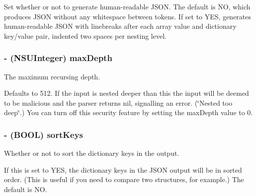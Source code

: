\-Set whether or not to generate human-\/readable \-J\-S\-O\-N. \-The default is \-N\-O, which produces \-J\-S\-O\-N without any whitespace between tokens. \-If set to \-Y\-E\-S, generates human-\/readable \-J\-S\-O\-N with linebreaks after each array value and dictionary key/value pair, indented two spaces per nesting level. \hypertarget{interface_s_b_json_stream_writer_a146e7e950ab74a0e766ffd860e454fc9}{
\subsubsection[{max\-Depth}]{\setlength{\rightskip}{0pt plus 5cm}-\/ (\-N\-S\-U\-Integer) max\-Depth}}
\label{interface_s_b_json_stream_writer_a146e7e950ab74a0e766ffd860e454fc9}


\-The maximum recursing depth. 

\-Defaults to 512. \-If the input is nested deeper than this the input will be deemed to be malicious and the parser returns nil, signalling an error. (\char`\"{}\-Nested too deep\char`\"{}.) \-You can turn off this security feature by setting the max\-Depth value to 0. \hypertarget{interface_s_b_json_stream_writer_ab206c6844a0fd20307b5dfe881e17bf2}{
\subsubsection[{sort\-Keys}]{\setlength{\rightskip}{0pt plus 5cm}-\/ (\-B\-O\-O\-L) sort\-Keys}}
\label{interface_s_b_json_stream_writer_ab206c6844a0fd20307b5dfe881e17bf2}


\-Whether or not to sort the dictionary keys in the output. 

\-If this is set to \-Y\-E\-S, the dictionary keys in the \-J\-S\-O\-N output will be in sorted order. (\-This is useful if you need to compare two structures, for example.) \-The default is \-N\-O. 

